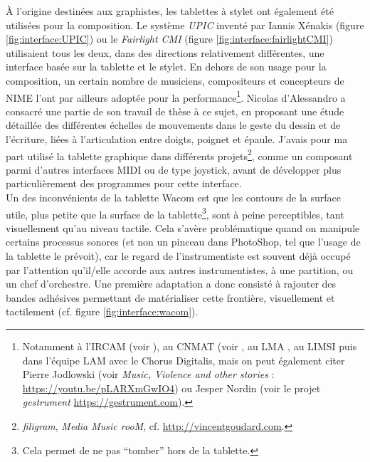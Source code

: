 \indent À l'origine destinées aux graphistes, les tablettes à stylet ont également été utilisées pour la composition. Le système \textit{UPIC} inventé par Iannis Xénakis (figure \ref{fig:interface:UPIC}) ou le \textit{Fairlight CMI}  (figure \ref{fig:interface:fairlightCMI}) utilisaient tous les deux, dans des directions relativement différentes, une interface basée sur la tablette et le stylet. En dehors de son usage pour la composition, un certain nombre de musiciens, compositeurs et concepteurs de \gls{NIME} l’ont par ailleurs adoptée pour la performance\footnote{Notamment à l'\gls{IRCAM} (voir \cite{wanderley_choice_2000}), au \gls{CNMAT} (voir \cite{zbyszynski_ten_2007}, au \gls{LMA} \cite{couturier_utilisation_2004}, au \gls{LIMSI} \cite{feugere_chorus_2011} puis dans l'équipe \gls{LAM} \cite{xiao_t-voks_2019} avec le Chorus Digitalis, mais on peut également citer Pierre Jodlowski (voir \textit{Music, Violence and other stories} : \url{https://youtu.be/pLARXmGwIO4}) ou Jesper Nordin (voir le projet \textit{gestrument} \url{https://gestrument.com}).}. Nicolas d’Alessandro a consacré une partie de son travail de thèse \cite{dalessandro_realtime_2009} à ce sujet, en proposant une étude détaillée des différentes échelles de mouvements dans le geste du dessin et de l'écriture, liées à l'articulation entre doigts, poignet et épaule. J'avais pour ma part utilisé la tablette graphique dans différents projets\footnote{\textit{filigram}, \textit{Media Music rooM}, cf. \url{http://vincentgoudard.com}.  }, comme un composant parmi d'autres interfaces \gls{MIDI} ou de type joystick, avant de développer plus particulièrement des programmes pour cette interface.\\
\indent Un des inconvénients de la tablette Wacom est que les contours de la surface utile, plus petite que la surface de la tablette\footnote{Cela permet de ne pas ``tomber'' hors de la tablette.}, sont à peine perceptibles, tant visuellement qu'au niveau tactile. Cela s'avère problématique quand on manipule certains processus sonores (et non un pinceau dans PhotoShop, tel que l'usage de la tablette le prévoit), car le regard de l'instrumentiste est souvent déjà occupé par l'attention qu'il/elle accorde aux autres instrumentistes, à une partition, ou un chef d'orchestre. Une première adaptation a donc consisté à rajouter des bandes adhésives permettant de matérialiser cette frontière, visuellement et tactilement (cf. figure \ref{fig:interface:wacom}).\\
